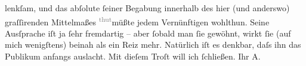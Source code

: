 \begin{ledgroupsized}[t]{13cm}
               lenkſam, und das abſolute ſeiner Begabung innerhalb {\pb}des hier (und anderswo) graſſirenden Mittelmaßes \substVorne{}\textsuperscript{\textcolor{gray}{thut}}\substDazwischen{}müßte\substHinten{} jedem Vernünftigen wohlthun. Seine Ausſprache iſt ja ſehr fremdartig – aber
               ſobald man ſie gewöhnt, wirkt ſie (auf mich wenigſtens) beinah als ein Reiz mehr.
               Natürlich iſt es denkbar, daſs ihn das Publikum anfangs auslacht. Mit dieſem Troſt
               will ich ſchließen. \pend
           \pstart Ihr \spacefill\mbox{A.}\pend{}\endnumbering{}\end{ledgroupsized}  \newcommand{\dateiname}{L01471}\newcommand{\titel}{Arthur Schnitzler an Richard Beer-Hofmann, 15. 11. 1904}\newcommand{\editorInnen}{Martin Anton Müller und Gerd-Hermann Susen}
      